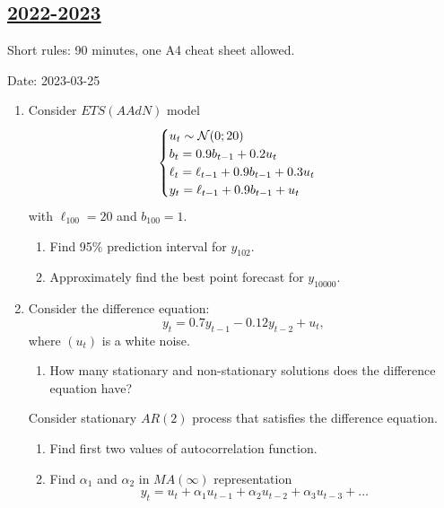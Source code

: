 \subsection[2022-2023]{\hyperref[sec:sol_kr_03_2022_2023]{2022-2023}}
\label{sec:kr_03_2022_2023} %

Short rules: 90 minutes, one A4 cheat sheet allowed. 

Date: 2023-03-25

\begin{enumerate}

    \item Consider $ETS(AAdN)$ model 
    \[
    \begin{cases}
    u_t  \sim \mathcal{N}(0;20) \\
    b_t = 0.9 b_{t-1} + 0.2 u_t \\
    \ell_t = \ell_{t-1} + 0.9 b_{t-1} + 0.3 u_t \\
    y_t = \ell_{t-1} + 0.9 b_{t-1} + u_t \\
    \end{cases}
    \]
    with $\ell_{100} = 20$ and $b_{100} = 1$.
    \begin{enumerate}
        \item Find 95\% prediction interval for $y_{102}$.
        \item Approximately find the best point forecast for $y_{10000}$.
    \end{enumerate}
    
    \item Consider the difference equation:
    \[
    y_t = 0.7y_{t-1} - 0.12 y_{t-2} + u_t,    
    \]
    where $(u_t)$ is a white noise. 
    \begin{enumerate}
        \item How many stationary and non-stationary solutions does the difference equation have?
    \end{enumerate}
    
    Consider stationary $AR(2)$ process that satisfies the difference equation. 
    
    \begin{enumerate}[resume]
        \item Find first two values of autocorrelation function.
        \item Find $\alpha_1$ and $\alpha_2$ in $MA(\infty)$ representation 
    \[
    y_t = u_t + \alpha_1 u_{t-1} + \alpha_2 u_{t-2} + \alpha_3 u_{t-3} + \ldots
    \]
    \end{enumerate}
    

\end{enumerate}
